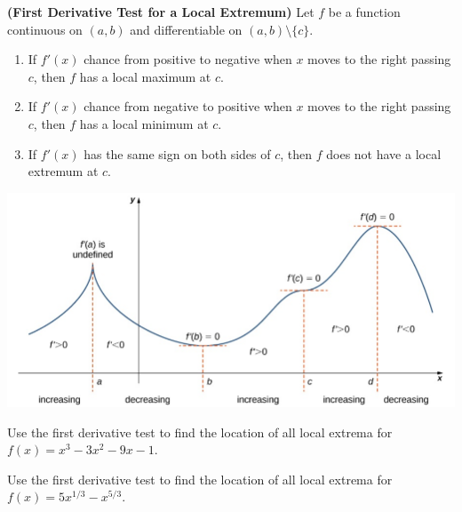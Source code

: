 \begin{proposition}

\textbf{(First Derivative Test for a Local Extremum)} Let \(f\) be a
function continuous on \((a, b)\) and differentiable on
\((a, b)\setminus\{c\}\).

\begin{enumerate}[sepno]
\item
  If \(f'(x)\) chance from positive to negative when \(x\) moves to the
  right passing \(c\), then \(f\) has a local maximum at \(c\).
\item
  If \(f'(x)\) chance from negative to positive when \(x\) moves to the
  right passing \(c\), then \(f\) has a local minimum at \(c\).
\item
  If \(f'(x)\) has the same sign on both sides of \(c\), then \(f\) does
  not have a local extremum at \(c\).
\end{enumerate}

\begin{fullwidth}
  \centering
  \includegraphics[scale=0.6]{img/image-20200413134520221.png}
\end{fullwidth}

\end{proposition}

\begin{example}

Use the first derivative test to find the location of all local extrema
for \(f(x)=x^3 - 3x^2 - 9x - 1\).

\end{example}
\vspace*{6\baselineskip}

\begin{example}

Use the first derivative test to find the location of all local extrema
for \(f(x)=5x^{1/3} - x^{5/3}\).

\end{example}
\vspace*{6\baselineskip}

